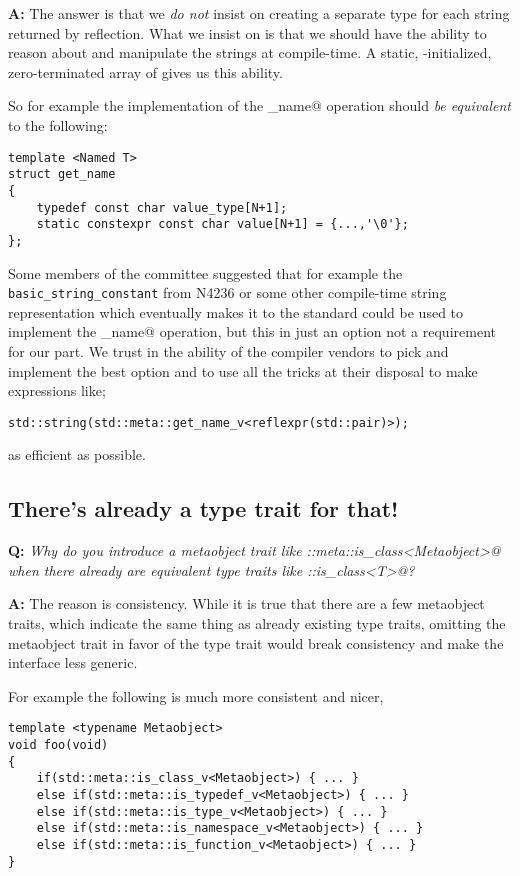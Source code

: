 \textbf{A:} The answer is that we {\em do not} insist on creating a separate
type for each string returned by reflection. What we insist on is that we
should have the ability to reason about and manipulate the strings at compile-time.
A static, \verb@constexpr@-initialized, zero-terminated array of \verb@char@s
gives us this ability.

So for example the implementation of the \verb@get_name@ operation should
{\em be equivalent} to the following:

\begin{verbatim}
template <Named T>
struct get_name
{
	typedef const char value_type[N+1];
	static constexpr const char value[N+1] = {...,'\0'};
};
\end{verbatim}

Some members of the committee suggested that for example the
\texttt{basic\_string\_constant} from N4236 or some other compile-time
string representation which eventually makes it to the standard could
be used to implement the \verb@get_name@ operation,
but this in just an option not a requirement for our part.
We trust in the ability of the compiler vendors to pick and
implement the best option and to use all the tricks at their disposal
to make expressions like;

\begin{verbatim}
std::string(std::meta::get_name_v<reflexpr(std::pair)>);
\end{verbatim}

as efficient as possible.

\subsection{There's already a type trait for that!}

\textbf{Q:} {\em Why do you introduce a metaobject trait like
\verb@std::meta::is_class<Metaobject>@  when there already are equivalent
type traits like \verb@std::is_class<T>@?}

\textbf{A:} The reason is consistency.
While it is true that there are a few metaobject traits, which indicate the
same thing as already existing type traits, omitting the metaobject trait
in favor of the type trait would break consistency and make the interface less generic.

For example the following is much more consistent and nicer,

\begin{verbatim}
template <typename Metaobject>
void foo(void)
{
	if(std::meta::is_class_v<Metaobject>) { ... }
	else if(std::meta::is_typedef_v<Metaobject>) { ... }
	else if(std::meta::is_type_v<Metaobject>) { ... }
	else if(std::meta::is_namespace_v<Metaobject>) { ... }
	else if(std::meta::is_function_v<Metaobject>) { ... }
}
\end{verbatim}

